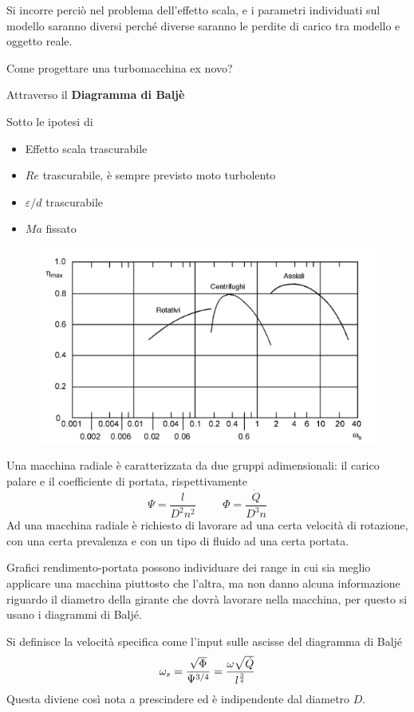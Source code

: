 \documentclass[a4paper, 15pt]{article}
\begin{document}
\begin{adjustwidth}{2in}{}
\begin{itemize}
			Si incorre perciò nel problema dell'effetto scala, e i parametri individuati sul modello saranno diversi perché diverse saranno le perdite di carico tra modello e oggetto reale. 
		\end{itemize}
	
	Come progettare una turbomacchina ex novo? 
	
	Attraverso il \textbf{{\large Diagramma di Baljè}} 
	
	
Sotto le ipotesi di 
\begin{itemize}
\item Effetto scala trascurabile
\item $Re$ trascurabile, è sempre previsto moto turbolento
\item $\varepsilon/d$ trascurabile 
\item $Ma$ fissato 
\end{itemize}
\begin{figure}[H]
\centering
\includegraphics[width=0.5\linewidth]{immagini/macchine}
\label{fig:macchine}
\end{figure}		
Una macchina radiale è caratterizzata da due gruppi adimensionali: il carico palare e il coefficiente di portata, rispettivamente 
\[\Psi = \dfrac{l}{D^2n^2}\hspace{1cm} \Phi = \dfrac{\dot{Q}}{D^3n}\]
Ad una macchina radiale è richiesto di lavorare ad una certa velocità di rotazione, con una certa prevalenza e con un tipo di fluido ad una certa portata. \newline 

Grafici rendimento-portata possono individuare dei range in cui sia meglio applicare una macchina piuttosto che l'altra, ma non danno alcuna informazione riguardo il diametro della girante che dovrà lavorare nella macchina, per questo si usano i diagrammi di Baljé. \newline 

Si definisce la velocità specifica come l'input sulle ascisse del diagramma di Baljé
\[\omega_s = \dfrac{\sqrt{\Phi}}{\Psi^{3/4}} = \dfrac{\omega\sqrt{\dot{Q}}}{l^{3\over4}}\]
Questa diviene così nota a prescindere ed è indipendente dal diametro $D$.\newline 


\end{adjustwidth}
\end{document}
